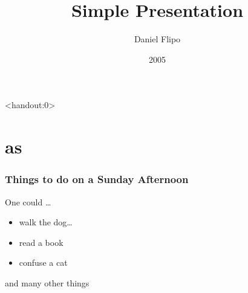 \documentclass[10pt]{beamer}
\title{Simple Presentation}
\author[D. Flipo]{Daniel Flipo}
\date{2005}
\begin{document}
\begin{frame}<handout:0>
\titlepage
\end{frame}
\section{as}
\begin{frame}
\frametitle{Things to do on a Sunday Afternoon}
\begin{block}{One could \ldots}
\begin{itemize}
\item walk the dog\dots \pause
\item read a book\pause
\item confuse a cat\pause
\end{itemize}
\end{block}
and many other things
\end{frame}
\end{document}
